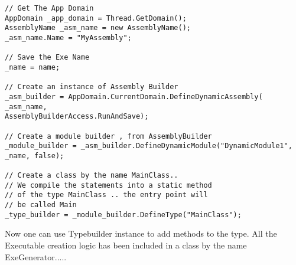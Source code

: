 \lstset{style=csharp}
\begin{lstlisting}
// Get The App Domain
AppDomain _app_domain = Thread.GetDomain();
AssemblyName _asm_name = new AssemblyName();
_asm_name.Name = "MyAssembly";

// Save the Exe Name
_name = name;

// Create an instance of Assembly Builder
_asm_builder = AppDomain.CurrentDomain.DefineDynamicAssembly(
_asm_name,
AssemblyBuilderAccess.RunAndSave);

// Create a module builder , from AssemblyBuilder
_module_builder = _asm_builder.DefineDynamicModule("DynamicModule1", _name, false);

// Create a class by the name MainClass..
// We compile the statements into a static method
// of the type MainClass .. the entry point will
// be called Main
_type_builder = _module_builder.DefineType("MainClass");
\end{lstlisting}
Now one can use Typebuilder instance to add methods to the type.
All the Executable creation logic has been included in a class by the name ExeGenerator.....
\lstset{style=csharp}
